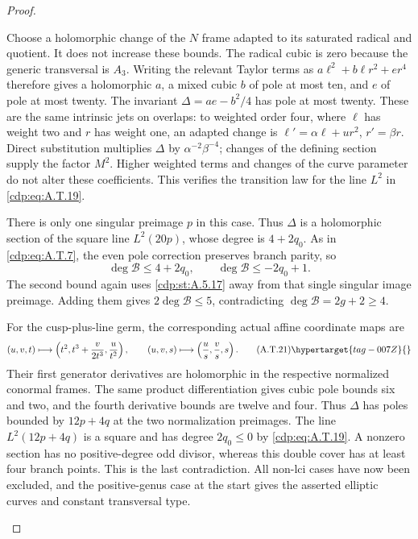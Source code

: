 \begin{proof}
\begin{enumerate}[label={$\langle1\rangle$\arabic*.},leftmargin=*]
Choose a holomorphic change of the $N$ frame adapted
to its saturated radical and quotient. It does not
increase these bounds. The radical cubic is zero
because the generic transversal is $A_3$.
Writing the relevant Taylor terms as
$a\ell^2+b\ell r^2+er^4$ therefore gives a
holomorphic $a$, a mixed cubic $b$ of pole at most
ten, and $e$ of pole at most twenty. The invariant
$\Delta=ae-b^2/4$ has pole at most twenty.
These are the same intrinsic jets on overlaps:
to weighted order four, where $\ell$ has weight
two and $r$ has weight one, an adapted change is
$\ell'=\alpha\ell+u r^2$, $r'=\beta r$.
Direct substitution multiplies $\Delta$ by
$\alpha^{-2}\beta^{-4}$; changes of the defining
section supply the factor $M^2$. Higher weighted
terms and changes of the curve parameter do not
alter these coefficients. This verifies the
transition law for the line $L^2$ in \eqref{cdp:eq:A.T.19}.

There is only one singular preimage $p$ in this case.
Thus $\Delta$ is a holomorphic section of the square
line $L^2(20p)$, whose degree is $4+2q_0$.
As in \eqref{cdp:eq:A.T.7}, the even pole correction preserves
branch parity, so
\[
 \deg\mathcal B\le4+2q_0,
 \qquad \deg\mathcal B\le-2q_0+1.
\]
The second bound again uses \ref{cdp:st:A.5.17} away from that
single singular image preimage. Adding them gives
$2\deg\mathcal B\le5$, contradicting
$\deg\mathcal B=2g+2\ge4$.

For the cusp-plus-line germ, the corresponding
actual affine coordinate maps are
\[
 (u,v,t)\longmapsto
       \left(t^2,t^3+\frac{v}{2t^3},\frac{u}{t^2}\right),
 \qquad
 (u,v,s)\longmapsto\left(\frac us,\frac vs,s\right).
                                                        \tag{A.T.21}\hypertarget{tag-007Z}{}\label{cdp:eq:A.T.21}
\]
Their first generator derivatives are holomorphic
in the respective normalized conormal frames.
The same product differentiation gives cubic pole
bounds six and two, and the fourth derivative bounds
are twelve and four. Thus $\Delta$ has poles bounded
by $12p+4q$ at the two normalization preimages.
The line $L^2(12p+4q)$ is a square and has degree
$2q_0\le0$ by \eqref{cdp:eq:A.T.19}. A nonzero section has no
positive-degree odd divisor, whereas this double
cover has at least four branch points. This is the
last contradiction. All non-lci cases have now
been excluded, and the positive-genus case at the
start gives the asserted elliptic curves and constant
transversal type.


\end{enumerate}
\end{proof}
